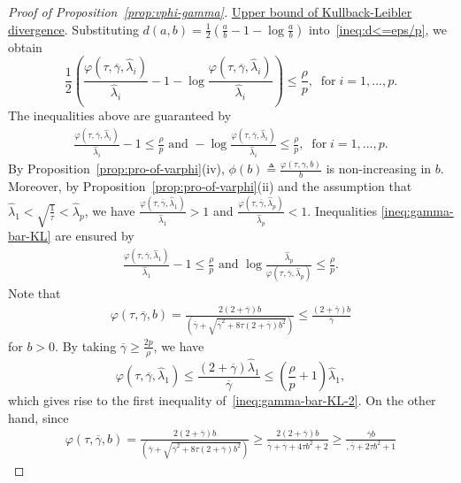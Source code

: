 \documentclass[11pt]{article}
\newcommand{\Let}{\triangleq}
\newcommand{\wh}{\widehat}
\begin{document}
\begin{proof}[Proof of Proposition~\ref{prop:vphi-gamma}]
    \underline{Upper bound of Kullback-Leibler divergence}. 
    Substituting $d(a,b) = \frac{1}{2}\left(\frac{a}{b}-1-\log\frac{a}{b}\right)$ into~\eqref{ineq:d<=eps/p}, we obtain 
    \[
        \frac{1}{2}\left(\frac{\varphi(\tau, \overline{\gamma}, \wh\lambda_i)}{\wh\lambda_i} - 1 - \log\frac{\varphi(\tau, \overline{\gamma}, \wh\lambda_i)}{\wh\lambda_i}\right)\leq \frac{ \rho}{p},\;\; \text{for}\; i=1,...,p.
    \]
   The inequalities above are guaranteed by 
    \begin{align}\label{ineq:gamma-bar-KL}
        \frac{\varphi(\tau, \overline{\gamma}, \wh\lambda_i)}{\wh\lambda_i} - 1 \leq \frac{ \rho}{p} \text{ and }  
        -\log\frac{\varphi(\tau, \overline{\gamma}, \wh\lambda_i)}{\wh\lambda_i} \leq \frac{ \rho}{p},\;\; \text{for} \;  i=1,...,p.
    \end{align}
    By Proposition~\ref{prop:pro-of-varphi}(iv), $\phi(b) \Let\frac{\varphi(\tau,\gamma,b)}{b}$ is non-increasing in $b$. Moreover, by Proposition~\ref{prop:pro-of-varphi}(ii) and the assumption that $\wh\lambda_1<\sqrt{\frac{1}{\tau}} < \wh\lambda_p$, we have $\frac{\varphi(\tau, \overline{\gamma}, \wh\lambda_1)}{\wh\lambda_1} > 1$ and $\frac{\varphi(\tau, \overline{\gamma}, \wh\lambda_p)}{\wh\lambda_p}<1$. 
   Inequalities \eqref{ineq:gamma-bar-KL} are ensured by  
    \begin{align}\label{ineq:gamma-bar-KL-2}
        \frac{\varphi(\tau, \overline{\gamma}, \wh\lambda_1)}{\wh\lambda_1} - 1 \leq \frac{ \rho}{p} \text{ and }  
        \log\frac{\wh\lambda_p}{\varphi(\tau, \overline{\gamma}, \wh\lambda_p)} \leq \frac{ \rho}{p}.
    \end{align}
    Note that 
    \begin{align*}
        \varphi(\tau, \overline{\gamma}, b) = \frac{2(2+\overline{\gamma})b}{\left(\overline{\gamma}+\sqrt{\overline{\gamma}^2+8\tau(2+\overline{\gamma})b^2}\right)} \leq \frac{(2+\overline{\gamma})b}{\overline{\gamma}}
    \end{align*}
    for $b>0$.
    By taking $\overline{\gamma}\geq \frac{2p}{ \rho}$, we have 
    \[
        \varphi(\tau, \overline{\gamma}, \wh\lambda_1)\leq \frac{(2+\overline{\gamma})\wh\lambda_1}{\overline{\gamma}} \leq (\frac{ \rho}{p}+1)\wh\lambda_1,
    \]
    which gives rise to the first inequality of~\eqref{ineq:gamma-bar-KL-2}. On the other hand, since 
    \begin{align*}
        \varphi(\tau, \overline{\gamma}, b) = \frac{2(2+\overline{\gamma})b}{\left(\overline{\gamma}+\sqrt{\overline{\gamma}^2+8\tau(2+\overline{\gamma})b^2}\right)} \geq \frac{2(2+\overline{\gamma})b}{\overline{\gamma}+\overline{\gamma}+4\tau b^2+2} \geq \frac{\overline{\gamma}b}{,\overline{\gamma}+2\tau b^2+1}

\end{align*}
\end{proof}
\end{document}
